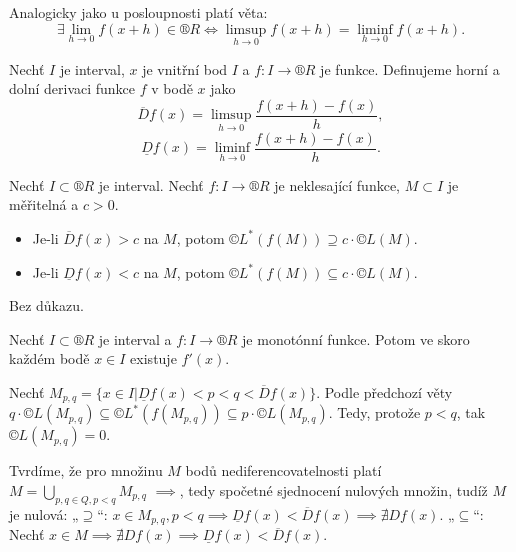 \documentclass[12pt]{article}					%
\begin{document}
	\begin{poznamka}
		Analogicky jako u posloupnosti platí věta:
		$$ \exists \lim_{h \rightarrow 0} f(x + h) \in ®R \Leftrightarrow \limsup_{h \rightarrow 0} f(x + h) = \liminf_{h \rightarrow 0} f(x + h). $$
	\end{poznamka}

	\begin{definice}
		Nechť $I$ je interval, $x$ je vnitřní bod $I$ a $f: I \rightarrow ®R$ je funkce. Definujeme horní a dolní derivaci funkce $f$ v bodě $x$ jako
		$$ \overline{D} f(x) = \limsup_{h \rightarrow 0} \frac{f(x + h) - f(x)}{h}, $$
		$$ \underline{D} f(x) = \liminf_{h \rightarrow 0} \frac{f(x + h) - f(x)}{h}. $$
	\end{definice}

	\begin{veta}
		Nechť $I \subset ®R$ je interval. Nechť $f: I \rightarrow ®R$ je neklesající funkce, $M \subset I$ je měřitelná a $c > 0$.

		\begin{itemize}
			\item Je-li $\overline{D} f(x) > c$ na $M$, potom $©L^*(f(M)) \supseteq c·©L(M)$.
			\item Je-li $\underline{D} f(x) < c$ na $M$, potom $©L^*(f(M)) \subseteq c·©L(M)$.
		\end{itemize}

		\begin{dukazin}
			Bez důkazu.
		\end{dukazin}
	\end{veta}

	\begin{veta}
		Nechť $I \subset ®R$ je interval a $f: I \rightarrow ®R$ je monotónní funkce. Potom ve skoro každém bodě $x \in I$ existuje $f'(x)$.

		\begin{dukazin}
			Nechť $M_{p, q} = \{x \in I | \underline{D}f(x) < p < q < \overline{D}f(x)\}$. Podle předchozí věty $q·©L(M_{p, q}) \subseteq ©L^*(f(M_{p, q})) \subseteq p·©L(M_{p, q})$. Tedy, protože $p < q$, tak $©L(M_{p, q}) = 0$.

			Tvrdíme, že pro množinu $M$ bodů nediferencovatelnosti platí $M = \bigcup_{p, q \in Q, p < q} M_{p, q}$ $\implies$, tedy spočetné sjednocení nulových množin, tudíž $M$ je nulová: „$\supseteq$“: $x \in M_{p, q}, p < q \implies \underline{D}f(x) < \overline{D}f(x) \implies \nexists D f(x)$. „$\subseteq$“: Nechť $x \in M \implies \nexists D f(x) \implies \underline{D} f(x) < \overline{D}f(x)$.
		\end{dukazin}
	\end{veta}
\end{document}

